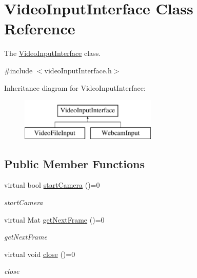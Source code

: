 \hypertarget{class_video_input_interface}{}\section{Video\+Input\+Interface Class Reference}
\label{class_video_input_interface}


The \hyperlink{class_video_input_interface}{Video\+Input\+Interface} class.  




{\ttfamily \#include $<$video\+Input\+Interface.\+h$>$}

Inheritance diagram for Video\+Input\+Interface\+:\begin{figure}[H]
\begin{center}
\leavevmode
\includegraphics[height=2.000000cm]{class_video_input_interface}
\end{center}
\end{figure}
\subsection*{Public Member Functions}
\begin{DoxyCompactItemize}
\item 
virtual bool \hyperlink{class_video_input_interface_a11be5c9dc74c58e24acf4b2ee71468f6}{start\+Camera} ()=0
\begin{DoxyCompactList}\small\item\em start\+Camera \end{DoxyCompactList}\item 
virtual Mat \hyperlink{class_video_input_interface_ad013678c645a2171bc31fd68851f2e3b}{get\+Next\+Frame} ()=0
\begin{DoxyCompactList}\small\item\em get\+Next\+Frame \end{DoxyCompactList}\item 
\hypertarget{class_video_input_interface_a701da28013bda686c93ffef702a4ff7f}{}virtual void \hyperlink{class_video_input_interface_a701da28013bda686c93ffef702a4ff7f}{close} ()=0\label{class_video_input_interface_a701da28013bda686c93ffef702a4ff7f}

\begin{DoxyCompactList}\small\item\em close \end{DoxyCompactList}\end{DoxyCompactItemize}
